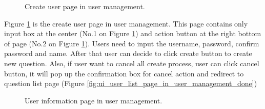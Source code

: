 \documentclass[12pt,oneside,openright,a4paper]{cpe-english-project}
\begin{document}
\begin{figure}[!h]\centering
		\caption{Create user page in user management.}\label{fig:ui_create_user_page_in_user_management_done}
	\end{figure}
Figure \ref*{fig:ui_create_user_page_in_user_management_done} is the create user page in user management. This page contains only 
input box at the center (No.1 on Figure \ref*{fig:ui_create_user_page_in_user_management_done}) and action button at the right bottom of page 
(No.2 on Figure \ref*{fig:ui_create_user_page_in_user_management_done}).
Users need to input the username, password, confirm password and name. After that 
user can decide to click create button to create new question. Also, if user want to cancel all 
create process, user can click cancel button, it will pop up the confirmation box for cancel 
action and redirect to question list page (Figure \ref*{fig:ui_user_list_page_in_user_management_done})
\begin{figure}[!h]\centering
		\caption{User information page in user management.}\label{fig:ui_user_information_page-in_user_management_done}
	\end{figure}
\end{document}
